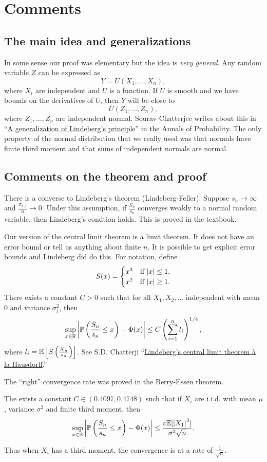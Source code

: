 \section{Comments}
\subsection{The main idea and generalizations}
In some sense our proof was elementary but the idea is \emph{very general}. Any random variable $Z$ can be expressed as 
\[Y=U(X_1,\ldots, X_n), \]
where $X_i$ are independent and $U$ is a function. If $U$ is smooth and we have bounds on the derivatives of $U$, then $Y$ will be close to 
\[U(Z_1,\ldots,Z_n),\]
where $Z_1,\ldots,Z_n$ are independent normal. Sourav Chatterjee writes about this in ``\href{https://www.jstor.org/stable/25449948
}{A generalization of Lindeberg's principle}'' in the Annals of Probability. The only property of the normal distribution that we really used was that normals have finite third moment and that sums of independent normals are normal. 
\subsection{Comments on the theorem and proof}
There is a converse to Lindeberg's theorem (Lindeberg-Feller). Suppose $s_n \to \infty$ and $\frac{\sigma_{n,i}}{n} \to 0$. Under this assumption, if $\frac{S_n}{s_n}$ converges weakly to a normal random variable, then Lindeberg's condtion holds. This is proved in the textbook.

Our version of the central limit theorem is a limit theorem. It does not have an error bound or tell us anything about finite $n$. It is possible to get explicit error bounds and Lindeberg did do this. For notation, define
\[S(x) = \begin{cases}
    x^3 &\text{if } {\left\lvert x\right\rvert} \le 1,\\
    x^2 &\text{if } {\left\lvert x\right\rvert} \ge 1.
\end{cases}\]
There exists a constant $C > 0$ such that for all $X_1,X_2,\ldots$ independent with mean 0 and variance $\sigma_i^2$, then 
\[\sup_{x \in {\mathbb R}} {\left\lvert{\mathbb{P}}\left(\frac{S_n}{s_n} \le x\right) - \Phi(x)\right\rvert} \le C\left(\sum_{i=1}^n l_i\right)^{1/4}, \]
where $l_i = {\mathbb{E}}\left[S\left(\frac{X_n}{s_n}\right)\right]$. See S.D. Chatterji ``\href{https://www.sciencedirect.com/science/article/pii/S0723086906000429}{Lindeberg's central limit theorem \`a la Hausdorff}.''

The ``right'' convergence rate was proved in the Berry-Essen theorem.
\begin{thrm}
    The exists a constant $C \in (0.4097,0.4748)$ such that if $X_i$ are i.i.d. with mean $\mu$, variance $\sigma^2$ and finite third moment, then 
    \[\sup_{x \in {\mathbb R}} {\left\lvert{\mathbb{P}}\left(\frac{S_n}{s_n} \le x\right)-\Phi(x)\right\rvert} \le \frac{c {\mathbb{E}}[{\left\lvert X_1\right\rvert}^3]}{\sigma^3\sqrt{n}}. \]
\end{thrm}
Thus when $X_i$ has a third moment, the convergence is at a rate of $\frac{1}{\sqrt{n}}$.
